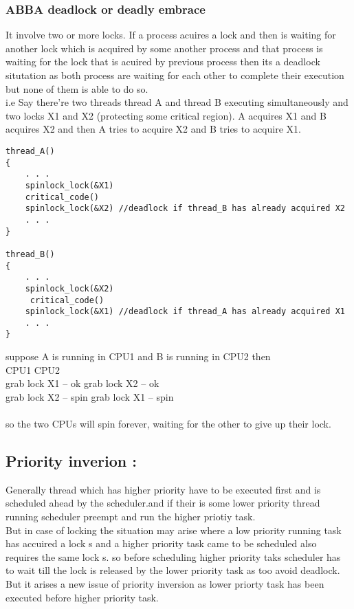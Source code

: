 \documentclass[a4paper]{article}
\begin{document}
\subsubsection{ABBA deadlock or deadly embrace }
It involve two or more locks. If a process acuires a lock and then is waiting for another lock which is acquired by some another process and that process is waiting for the lock that is acuired by previous process then its a deadlock situtation as both process are waiting for each other to complete their execution but none of them is able to do so.\\
i.e  Say there're two threads thread A and thread B executing simultaneously and two locks  X1 and X2 (protecting some critical region). A acquires X1 and B acquires X2 and then A tries to acquire X2 and B tries to acquire X1.

\begin{verbatim}
thread_A()
{
    . . .
    spinlock_lock(&X1)
    critical_code()
    spinlock_lock(&X2) //deadlock if thread_B has already acquired X2
    . . .
}

thread_B()
{
    . . .
    spinlock_lock(&X2)
     critical_code()
    spinlock_lock(&X1) //deadlock if thread_A has already acquired X1
    . . .
}

\end{verbatim}
suppose A is running in CPU1 and B is running in CPU2 then\\
\hspace*{10mm} CPU1 \hspace*{27mm} CPU2 \\
\hspace*{10mm} grab lock X1 -- ok  \hspace*{7mm} grab lock X2 -- ok \\ 
\hspace*{10mm} grab lock X2 -- spin \hspace*{4mm} grab lock X1 -- spin \\
\\
so the two CPUs will spin forever, waiting for the other to give up their lock.

\subsection{Priority inverion :}
Generally thread which has higher priority have to be executed first and is scheduled ahead by the scheduler.and if their is some lower priority thread running scheduler preempt and run the higher priotiy task.\\
But in case of locking the situation may arise where a low priority running task has accuired a lock s and a higher priority task came to be scheduled also requires the same lock s. so before scheduling higher priority taks scheduler has to wait till the lock is released by the lower priority task as too avoid deadlock. But it arises a new issue of priority inversion as lower priorty task has been executed before higher priority task.
\end{document}
